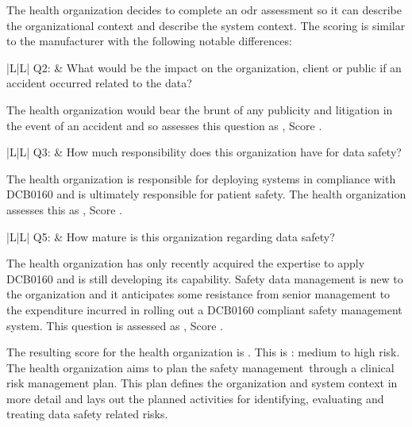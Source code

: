 The health organization decides to complete an \gls{odr} assessment
so it can describe the organizational context and describe the system context. The scoring is similar to the manufacturer with the following notable differences:

\addtocounter{table}{-1} %
\begin{longtable*}[H]
	{|L{}|L{}|}
	\hline
	Q2: & What would be the impact on the organization, client or public if an accident occurred related to the data?\\
	\hline
\end{longtable*}

The health organization would bear the brunt of any publicity and litigation in the event of an accident and so assesses this question as , Score .

\addtocounter{table}{-1} %
\begin{longtable*}[H]
	{|L{}|L{}|}
	\hline
	Q3: & How much responsibility does this organization have for data safety?\\
	\hline
\end{longtable*}

The health organization is responsible for deploying systems in compliance with
DCB0160 \cite{citation:dcb0160clinical}
and is ultimately responsible for patient safety. The health organization assesses this as , Score .

\addtocounter{table}{-1} %
\begin{longtable*}[H]
	{|L{}|L{}|}
	\hline
	Q5: & How mature is this organization regarding data safety?\\
	\hline
\end{longtable*}

The health organization has only recently acquired the expertise to apply
DCB0160
and is still developing its capability. Safety data management is new to the organization and it anticipates some resistance from senior management to the expenditure incurred in rolling out a DCB0160 compliant safety management system. This question is assessed as , Score .

The resulting score for the health organization is . This is : medium to high risk.
The health organization aims to plan the \cbstart safety management\cbend\ through a clinical risk management plan. This plan defines the organization and system context in more detail and lays out the planned activities for identifying, evaluating and treating data safety related risks.

